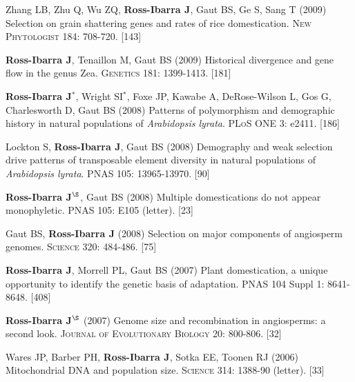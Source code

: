 \documentclass[letterpaper,10pt]{article}
\begin{document}
\begin{etaremune}
\item Zhang LB, Zhu Q, Wu ZQ, {\bf Ross-Ibarra J}, Gaut BS, Ge S, Sang T (2009) Selection on grain shattering genes and rates of rice domestication.  \textsc{New Phytologist} 184: 708-720.
 [143]\\

\item {\bf Ross-Ibarra J}, Tenaillon M, Gaut BS (2009) Historical divergence and gene flow in the genus Zea.  \textsc{Genetics} 181: 1399-1413.
 [181]\\


\item {\bf Ross-Ibarra J}$^*$, Wright SI$^*$, Foxe JP, Kawabe A, DeRose-Wilson L, Gos G, Charlesworth D, Gaut BS (2008) Patterns of polymorphism and demographic history in natural populations of \emph{Arabidopsis lyrata}.  \textsc{PLoS ONE} 3: e2411.
 [186]\\


\item Lockton S, {\bf Ross-Ibarra J}, Gaut BS (2008) Demography and weak selection drive patterns of transposable element diversity in natural populations of \emph{Arabidopsis lyrata}. PNAS 105: 13965-13970.
 [90]\\


\item {\bf Ross-Ibarra J}$^\S$, Gaut BS (2008) Multiple domestications do not appear monophyletic. PNAS 105: E105 (letter).
 [23]\\


\item Gaut BS, {\bf Ross-Ibarra J} (2008) Selection on major components of angiosperm genomes.  \textsc{Science} 320: 484-486.
 [75]\\


\item {\bf Ross-Ibarra J}, Morrell PL, Gaut BS (2007) Plant domestication, a unique opportunity to identify the genetic basis of adaptation. PNAS 104 Suppl 1: 8641-8648.
 [408]\\


\item {\bf Ross-Ibarra J}$^\S$ (2007) Genome size and recombination in angiosperms: a second look.  \textsc{Journal of Evolutionary Biology} 20: 800-806.
 [32]\\


\item Wares JP, Barber PH, {\bf Ross-Ibarra J}, Sotka EE, Toonen RJ (2006) Mitochondrial DNA and population size.  \textsc{Science} 314: 1388-90 (letter).
 [33]\\



\end{etaremune}
\end{document}

